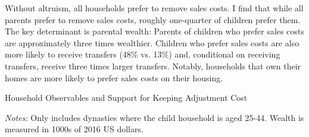 \documentclass[12pt]{article}
\begin{document}
Without altruism, all households prefer to remove sales costs. I find that while all parents prefer to remove sales costs, roughly one-quarter of children prefer them. The key determinant is parental wealth: Parents of children who prefer sales costs are approximately three times wealthier. Children who prefer sales costs are also more likely to receive transfers (48\% vs. 13\%) and, conditional on receiving transfers, receive three times larger transfers. Notably, households that own their homes are more likely to prefer sales costs on their housing.

\begin{table}
	\center
	\caption{Household Observables and Support for Keeping Adjustment Cost}\label{tab:adjcost}
	\begin{threeparttable}
		
		\footnotesize
		\textit{Notes:} Only includes dynasties where the child household is aged 25-44. Wealth is measured in 1000s of 2016 US dollars.
	\end{threeparttable}
\end{table}
\end{document}
